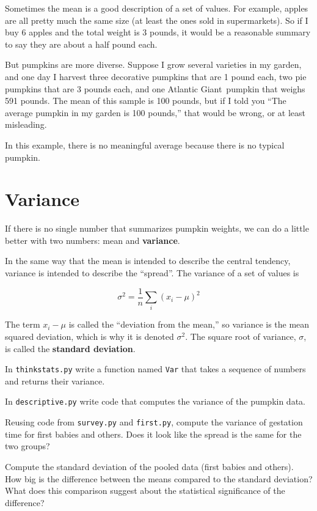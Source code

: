 \documentclass[10pt]{book}
\begin{document}
Sometimes the mean is a good description of a set of values.  For
example, apples are all pretty much the same size (at least the ones
sold in supermarkets).  So if I buy 6 apples and the total weight is 3
pounds, it would be a reasonable summary to say they are about a half
pound each.

But pumpkins are more diverse.  Suppose I grow several varieties in my
garden, and one day I harvest three decorative pumpkins that are 1
pound each, two pie pumpkins that are 3 pounds each, and one Atlantic
Giant\textregistered~pumpkin that weighs 591 pounds.  The mean of
this sample is 100 pounds, but if I told you ``The average pumpkin
in my garden is 100 pounds,'' that would be wrong, or at least
misleading.

In this example, there is no meaningful average because
there is no typical pumpkin.

\section{Variance}

If there is no single number that summarizes pumpkin weights,
we can do a little better with two numbers: mean and {\bf variance}.

In the same way that the mean is intended to describe the central
tendency, variance is intended to describe the ``spread''.
The variance of a set of values is

\[ \sigma^2 = \frac{1}{n} \sum_i (x_i - \mu)^2 \]

The term $x_i - \mu$ is called the ``deviation from the mean,'' so
variance is the mean squared deviation, which is why it is denoted
$\sigma^2$.  The square root of variance, $\sigma$, is called the {\bf
  standard deviation}.

\begin{ex}
In {\tt thinkstats.py} write a function named {\tt Var} that takes a
sequence of numbers and returns their variance.

In {\tt descriptive.py} write code that
computes the variance of the pumpkin data.
\end{ex}

\begin{ex}
Reusing code from {\tt survey.py} and {\tt first.py}, compute the
variance of gestation time for first babies and others.  Does it look
like the spread is the same for the two groups?
\end{ex}

\begin{ex}
Compute the standard deviation of the pooled data (first babies
and others).  How big is the difference between the
means compared to the standard deviation?  What does this comparison
suggest about the statistical significance of the difference?
\end{ex}
\end{document}
